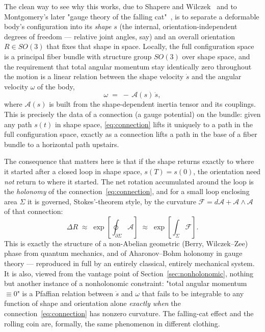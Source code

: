 The clean way to see why this works, due to Shapere and
Wilczek~\cite{ShapereWilczek1989} and to Montgomery's later "gauge
theory of the falling cat"~\cite{Montgomery1993}, is to separate a
deformable body's configuration into its \emph{shape} $s$ (the
internal, orientation-independent degrees of freedom --- relative
joint angles, say) and an overall orientation $R\in SO(3)$ that fixes
that shape in space. Locally, the full configuration space is a
principal fiber bundle with structure group $SO(3)$ over shape space,
and the requirement that total angular momentum stay identically
zero throughout the motion is a linear relation between the shape
velocity $\dot s$ and the angular velocity $\omega$ of the body,
\begin{equation}
  \omega \;=\; -\,\mathcal A(s)\,\dot s ,
  \label{eq:connection}
\end{equation}
where $\mathcal A(s)$ is built from the shape-dependent inertia
tensor and its couplings. This is precisely the data of a connection
(a gauge potential) on the bundle: given any path $s(t)$ in shape
space, \eqref{eq:connection} lifts it uniquely to a path in the full
configuration space, exactly as a connection lifts a path in the
base of a fiber bundle to a horizontal path upstairs.

The consequence that matters here is that if the shape returns
exactly to where it started after a closed loop in shape space,
$s(T) = s(0)$, the orientation need \emph{not} return to where it
started. The net rotation accumulated around the loop is the
\emph{holonomy} of the connection~\eqref{eq:connection}, and for a
small loop enclosing area $\Sigma$ it is governed, Stokes'-theorem
style, by the curvature $\mathcal F = d\mathcal A + \mathcal
A\wedge\mathcal A$ of that connection:
\begin{equation}
  \Delta R \;\approx\; \exp\!\left[\oint_{\partial\Sigma}\mathcal
  A\right] \;\approx\; \exp\!\left[\int_{\Sigma}\mathcal F\right].
  \label{eq:holonomy}
\end{equation}
This is exactly the structure of a non-Abelian geometric (Berry,
Wilczek--Zee) phase from quantum mechanics, and of Aharonov--Bohm
holonomy in gauge theory --- reproduced in full by an entirely
classical, entirely mechanical system. It is also, viewed from the
vantage point of Section~\ref{sec:nonholonomic}, nothing but another
instance of a nonholonomic constraint: "total angular momentum
$\equiv 0$" is a Pfaffian relation between $\dot s$ and $\omega$ that
fails to be integrable to any function of shape and orientation
alone \emph{exactly when} the connection~\eqref{eq:connection} has
nonzero curvature. The falling-cat effect and the rolling coin are,
formally, the same phenomenon in different clothing.

